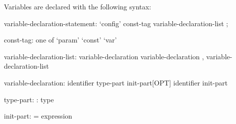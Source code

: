 Variables are declared with the following syntax:
\begin{syntax}
variable-declaration-statement:
  `config' const-tag variable-declaration-list ;

const-tag: one of
  `param' `const' `var'

variable-declaration-list:
  variable-declaration
  variable-declaration , variable-declaration-list

variable-declaration:
  identifier type-part init-part[OPT]
  identifier init-part

type-part:
  : type

init-part:
  = expression
\end{syntax}
